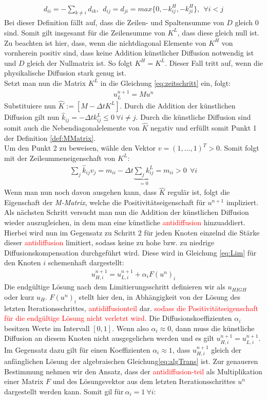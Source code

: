 \documentclass[a4paper,11pt]{article}
\newcommand{\col}[2][red]{\textcolor{#1}{#2}}
\begin{document}
\begin{align}
 d_{ii}=-\sum_{k\neq i}d_{ik},~~d_{ij}=d_{ji}=max\{0,-k_{ij}^H,-k_{ji}^H\},~~\forall i<j
\end{align}
Bei dieser Definition fällt auf, dass die Zeilen- und Spaltensumme von $D$ gleich 0 sind. Somit gilt insgesamt für die Zeilensumme von $K^L$, dass diese gleich null ist. Zu beachten ist hier, dass, wenn die nichtdiagonal Elemente von $K^H$ von vornherein positiv sind, dass keine Addition künstlicher Diffusion notwendig ist und $D$ gleich der Nullmatrix ist. So folgt $K^H=K^L$. Dieser Fall tritt auf, wenn die physikalische Diffusion stark genug ist.\\
Setzt man nun die Matrix $K^L$ in die Gleichung \eqref{eq:zeitschritt} ein, folgt:
\begin{align}
 [M-\Delta tK^L]u_L^{n+1}=Mu^n
\end{align}
Substituiere nun $\widehat{K}:=[M-\Delta tK^L]$. Durch die Addition der künstlichen Diffusion gilt nun $\widehat{k}_{ij}=-\Delta tk_{ij}^L\le0~\forall i\neq j$. Durch die künstliche Diffusion sind somit auch die Nebendiagonalelemente von $\widehat{K}$ negativ und erfüllt somit Punkt 1 der Definition \ref{def:MMatrix}.\\
Um den Punkt 2 zu beweisen, wähle den Vektor $v=(1,\dots,1)^T>0$. Somit folgt mit der Zeilsummeneigenschaft von $K^L$:
\begin{align}
 \sum_j \widehat{k}_{ij} v_j=m_{ii} - \Delta t\underbrace{\sum_j k_{ij}^L}_{=0}=m_{ii}>0~~\forall i
\end{align}
Wenn man nun noch davon ausgehen kann, dass $\widehat{K}$ regulär ist, folgt die Eigenschaft der \textit{M-Matrix}, welche die Positivitätseigenschaft für $u^{n+1}$ impliziert.\\
Als nächsten Schritt versucht man nun die Addition der künstlichen Diffusion wieder auszugleichen, in dem man eine künstliche \col{antidiffusion} hinzuaddiert. Hierbei wird nun im Gegensatz zu Schritt 2 für jeden Knoten einzelnd die Stärke dieser \col{antidiffusion}  limitiert, sodass keine zu hohe bzw. zu niedrige Diffusionskompensation durchgeführt wird. Diese wird in Gleichung \eqref{eq:Lim} für den Knoten $i$ schemenhaft dargestellt:
\begin{align}
 u_{H,i}^{n+1}=u_{L,i}^{n+1} +\alpha_iF(u^n)_i\label{eq:Lim}
\end{align}
Die endgültige Lösung nach dem Limitierungsschritt definieren wir als $u_{HIGH}$ oder kurz $u_H$. $F(u^n)_i$ stellt hier den, in Abhängigkeit von der Lösung des letzten Iterationsschrittes, \col{antidiffusionteil} dar. \col{sodass die Positivitätseigenschaft für die endgültige Lösung nicht verletzt wird.} Die Diffusionskoeffizienten $\alpha_i$  besitzen Werte im Intervall $[0,1]$. Wenn also $\alpha_i\approx0$, dann muss die künstliche Diffusion an diesem Knoten nicht ausgegelichen werden und es gilt $u_{H,i}^{n+1}=u_{L,i}^{n+1}$. Im Gegensatz dazu gilt für einen Koeffizienten $\alpha_i\approx1$, dass $u_{H,i}^{n+1}$ gleich der anfänglichen Lösung der algebraischen Gleichung\eqref{eq:algTrans} ist. Zur genaueren Bestimmung nehmen wir den Ansatz, dass der \col{antidiffusion-teil} als Multiplikation einer Matrix $F$ und des Lösungsvektor aus dem letzten Iterationsschrittes $u^n$ dargestellt werden kann. Somit gil für$~\alpha_i=1~\forall i$:
\end{document}
